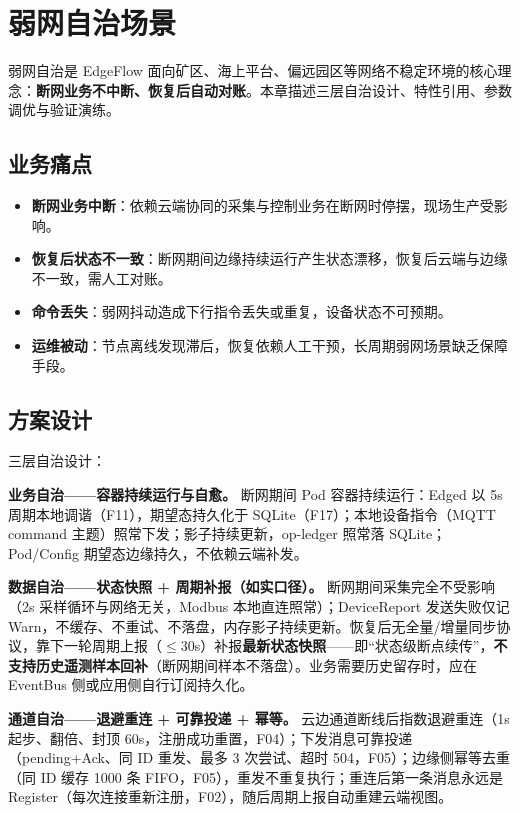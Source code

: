 \chapter{弱网自治场景}

弱网自治是 EdgeFlow 面向矿区、海上平台、偏远园区等网络不稳定环境的核心理念：\textbf{断网业务不中断、恢复后自动对账}。本章描述三层自治设计、特性引用、参数调优与验证演练。

\section{业务痛点}

\begin{itemize}
  \item \textbf{断网业务中断}：依赖云端协同的采集与控制业务在断网时停摆，现场生产受影响。
  \item \textbf{恢复后状态不一致}：断网期间边缘持续运行产生状态漂移，恢复后云端与边缘不一致，需人工对账。
  \item \textbf{命令丢失}：弱网抖动造成下行指令丢失或重复，设备状态不可预期。
  \item \textbf{运维被动}：节点离线发现滞后，恢复依赖人工干预，长周期弱网场景缺乏保障手段。
\end{itemize}

\section{方案设计}

三层自治设计：

\textbf{业务自治——容器持续运行与自愈。} 断网期间 Pod 容器持续运行：Edged 以 5s 周期本地调谐（F11），期望态持久化于 SQLite（F17）；本地设备指令（MQTT command 主题）照常下发；影子持续更新，op-ledger 照常落 SQLite；Pod/Config 期望态边缘持久，不依赖云端补发。

\textbf{数据自治——状态快照 + 周期补报（如实口径）。} 断网期间采集完全不受影响（2s 采样循环与网络无关，Modbus 本地直连照常）；DeviceReport 发送失败仅记 Warn，不缓存、不重试、不落盘，内存影子持续更新。恢复后无全量/增量同步协议，靠下一轮周期上报（$\le$30s）补报\textbf{最新状态快照}——即“状态级断点续传”，\textbf{不支持历史遥测样本回补}（断网期间样本不落盘）。业务需要历史留存时，应在 EventBus 侧或应用侧自行订阅持久化。

\textbf{通道自治——退避重连 + 可靠投递 + 幂等。} 云边通道断线后指数退避重连（1s 起步、翻倍、封顶 60s，注册成功重置，F04）；下发消息可靠投递（pending+Ack、同 ID 重发、最多 3 次尝试、超时 504，F05）；边缘侧幂等去重（同 ID 缓存 1000 条 FIFO，F05），重发不重复执行；重连后第一条消息永远是 Register（每次连接重新注册，F02），随后周期上报自动重建云端视图。

